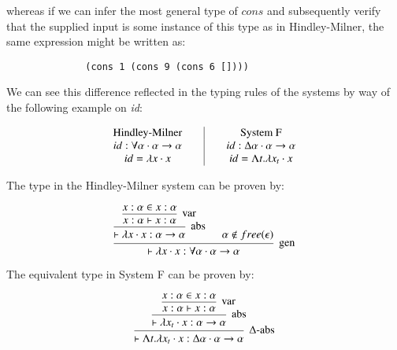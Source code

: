             whereas if we can infer the most general type of $cons$ and
            subsequently verify that the supplied input is some instance of this
            type as in Hindley-Milner, the same expression might be written as:
            
            \begin{verbatim}
              (cons 1 (cons 9 (cons 6 [])))  
            \end{verbatim}
            
            We can see this difference reflected in the typing rules of the
            systems by way of the following example on \emph{id}:
            
            \[\begin{array}{c@{\qquad}|@{\qquad}c}
                  \mbox{Hindley-Milner}
                  &
                  \mbox{System F}
                  \\
                  id : \forall \alpha \cdot \alpha \to \alpha
                  &
                  id : \Delta \alpha \cdot \alpha \to \alpha
                  \\                  id = \lambda x \cdot x
                  &
                  id = \Lambda t . \lambda x_t \cdot x
            \end{array} \]
            
            The type in the Hindley-Milner system can be proven by:
            
            
            \[\begin{array}{c}
            \mbox{\begin{prooftree}
                    \hypo{x : \alpha \in x : \alpha}   
                  \infer1[var]{x : \alpha \vdash x : \alpha}
                \infer1[abs]{\vdash \lambda x \cdot x : \alpha \to \alpha}
                \hypo{\alpha \notin free(\epsilon)}
               \infer2[gen]{\vdash \lambda x \cdot x : \forall \alpha \cdot
               \alpha \to \alpha}
            \end{prooftree}}
            \end{array} \]
            
            
            The equivalent type in System F can be proven by:
            
            \[\begin{array}{c}
            \mbox{\begin{prooftree}
                  \hypo{x : \alpha \in x : \alpha}
                \infer1[var]{x : \alpha \vdash x : \alpha}
               \infer1[abs]{\vdash \lambda x_t \cdot x : \alpha \to \alpha}
               \infer1[$\Delta$-abs]{\vdash \Lambda t . \lambda x_t \cdot
                 x : \Delta \alpha \cdot \alpha \to \alpha}
            \end{prooftree}}
            \end{array} \]
            
